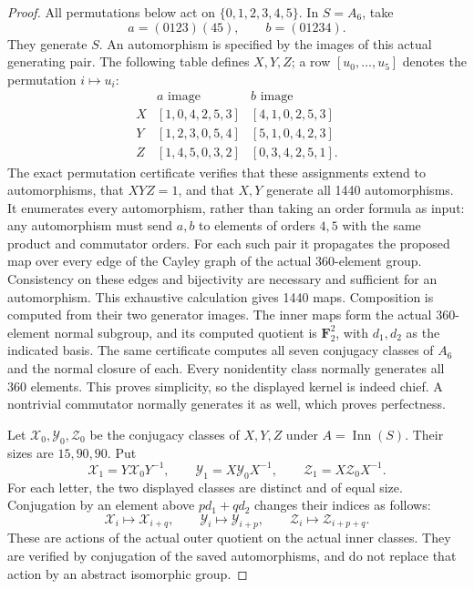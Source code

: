 \begin{proof}
All permutations below act on $\{0,1,2,3,4,5\}$.
In $S=A_6$, take
\[
            a=(0123)(45),\qquad b=(01234).
 \tag{D.31.5}
\]
They generate $S$.  An automorphism is specified
by the images of this actual generating pair.
The following table defines $X,Y,Z$; a row
$[u_0,\ldots,u_5]$ denotes the permutation
$i\mapsto u_i$:
\[
 \begin{array}{c|cc}
       &a\text{ image}&b\text{ image}\\\hline
 X &[1,0,4,2,5,3]&[4,1,0,2,5,3]\\
 Y &[1,2,3,0,5,4]&[5,1,0,4,2,3]\\
 Z &[1,4,5,0,3,2]&[0,3,4,2,5,1].
 \end{array}
 \tag{D.31.6}
\]
The exact permutation certificate verifies
that these assignments extend to automorphisms,
that $XYZ=1$, and that $X,Y$ generate all
1440 automorphisms.  It enumerates every
automorphism, rather than taking an order
formula as input: any automorphism must
send $a,b$ to elements of orders $4,5$
with the same product and commutator orders.
For each such pair it propagates the proposed
map over every edge of the Cayley graph of
the actual 360-element group.  Consistency
on these edges and bijectivity are necessary
and sufficient for an automorphism.  This
exhaustive calculation gives 1440 maps.
Composition is computed from their two
generator images.  The inner maps form
the actual 360-element normal subgroup,
and its computed quotient is $\mathbf F_2^2$,
with $d_1,d_2$ as the indicated basis.
The same certificate computes all seven
conjugacy classes of $A_6$ and the normal
closure of each.  Every nonidentity class
normally generates all 360 elements.
This proves simplicity, so the displayed
kernel is indeed chief.  A nontrivial
commutator normally generates it as well,
which proves perfectness.

Let $\mathcal X_0,\mathcal Y_0,\mathcal Z_0$
be the conjugacy classes of $X,Y,Z$ under
$A=\operatorname{Inn}(S)$.
Their sizes are $15,90,90$.
Put
\[
 \mathcal X_1=Y\mathcal X_0Y^{-1},\qquad
 \mathcal Y_1=X\mathcal Y_0X^{-1},\qquad
 \mathcal Z_1=X\mathcal Z_0X^{-1}.
 \tag{D.31.7}
\]
For each letter, the two displayed classes
are distinct and of equal size.  Conjugation
by an element above $p d_1+q d_2$ changes
their indices as follows:
\[
 \mathcal X_i\longmapsto\mathcal X_{i+q},\qquad
 \mathcal Y_i\longmapsto\mathcal Y_{i+p},\qquad
 \mathcal Z_i\longmapsto\mathcal Z_{i+p+q}.
 \tag{D.31.8}
\]
These are actions of the actual outer
quotient on the actual inner classes.
They are verified by conjugation of
the saved automorphisms, and do not
replace that action by an abstract
isomorphic group.


\end{proof}
